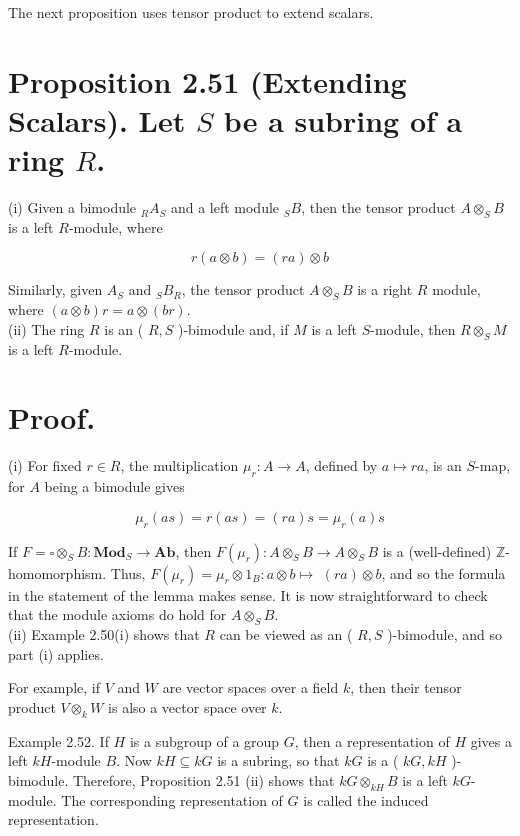 \documentclass[10pt]{article}
\begin{document}
The next proposition uses tensor product to extend scalars.

\section*{Proposition 2.51 (Extending Scalars). Let $S$ be a subring of a ring $R$.}
(i) Given a bimodule ${ }_{R} A_{S}$ and a left module ${ }_{S} B$, then the tensor product $A \otimes_{S} B$ is a left $R$-module, where

$$
r(a \otimes b)=(r a) \otimes b
$$

Similarly, given $A_{S}$ and ${ }_{S} B_{R}$, the tensor product $A \otimes_{S} B$ is a right $R$ module, where $(a \otimes b) r=a \otimes(b r)$.\\
(ii) The ring $R$ is an ( $R, S$ )-bimodule and, if $M$ is a left $S$-module, then $R \otimes_{S} M$ is a left $R$-module.

\section*{Proof.}
(i) For fixed $r \in R$, the multiplication $\mu_{r}: A \rightarrow A$, defined by $a \mapsto r a$, is an $S$-map, for $A$ being a bimodule gives

$$
\mu_{r}(a s)=r(a s)=(r a) s=\mu_{r}(a) s
$$

If $F=\square \otimes_{S} B: \mathbf{M o d}_{S} \rightarrow \mathbf{A b}$, then $F\left(\mu_{r}\right): A \otimes_{S} B \rightarrow A \otimes_{S} B$ is a (well-defined) $\mathbb{Z}$-homomorphism. Thus, $F\left(\mu_{r}\right)=\mu_{r} \otimes 1_{B}: a \otimes b \mapsto$ $(r a) \otimes b$, and so the formula in the statement of the lemma makes sense. It is now straightforward to check that the module axioms do hold for $A \otimes_{S} B$.\\
(ii) Example 2.50(i) shows that $R$ can be viewed as an ( $R, S$ )-bimodule, and so part (i) applies.

For example, if $V$ and $W$ are vector spaces over a field $k$, then their tensor product $V \otimes_{k} W$ is also a vector space over $k$.

Example 2.52. If $H$ is a subgroup of a group $G$, then a representation of $H$ gives a left $k H$-module $B$. Now $k H \subseteq k G$ is a subring, so that $k G$ is a ( $k G, k H$ )-bimodule. Therefore, Proposition 2.51 (ii) shows that $k G \otimes_{k H} B$ is a left $k G$-module. The corresponding representation of $G$ is called the induced representation.
\end{document}
